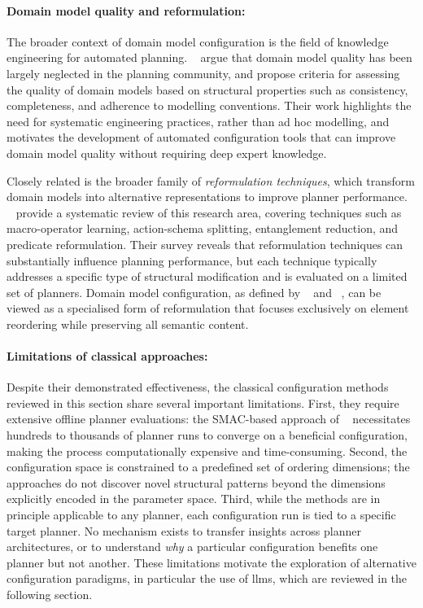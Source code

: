 \paragraph{Domain model quality and reformulation:}
The broader context of domain model configuration is the field of knowledge engineering for automated planning.
\citeauthor{McCluskey2017}~\cite{McCluskey2017} argue that domain model quality has been largely neglected in the planning community, and propose criteria for assessing the quality of domain models based on structural properties such as consistency, completeness, and adherence to modelling conventions.
Their work highlights the need for systematic engineering practices, rather than ad hoc modelling, and motivates the development of automated configuration tools that can improve domain model quality without requiring deep expert knowledge.

Closely related is the broader family of \emph{reformulation techniques}, which transform domain models into alternative representations to improve planner performance.
\citeauthor{Alarnaouti2023}~\cite{Alarnaouti2023} provide a systematic review of this research area, covering techniques such as macro-operator learning, action-schema splitting, entanglement reduction, and predicate reformulation.
Their survey reveals that reformulation techniques can substantially influence planning performance, but each technique typically addresses a specific type of structural modification and is evaluated on a limited set of planners.
Domain model configuration, as defined by \citeauthor{Vallati2015}~\cite{Vallati2015} and \citeauthor{Vallati2021}~\cite{Vallati2021}, can be viewed as a specialised form of reformulation that focuses exclusively on element reordering while preserving all semantic content.

\paragraph{Limitations of classical approaches:}
Despite their demonstrated effectiveness, the classical configuration methods reviewed in this section share several important limitations.
First, they require extensive offline planner evaluations: the SMAC-based approach of \citeauthor{Vallati2015}~\cite{Vallati2015} necessitates hundreds to thousands of planner runs to converge on a beneficial configuration, making the process computationally expensive and time-consuming.
Second, the configuration space is constrained to a predefined set of ordering dimensions; the approaches do not discover novel structural patterns beyond the dimensions explicitly encoded in the parameter space.
Third, while the methods are in principle applicable to any planner, each configuration run is tied to a specific target planner. No mechanism exists to transfer insights across planner architectures, or to understand \emph{why} a particular configuration benefits one planner but not another.
These limitations motivate the exploration of alternative configuration paradigms, in particular the use of \glspl{llm}, which are reviewed in the following section.

